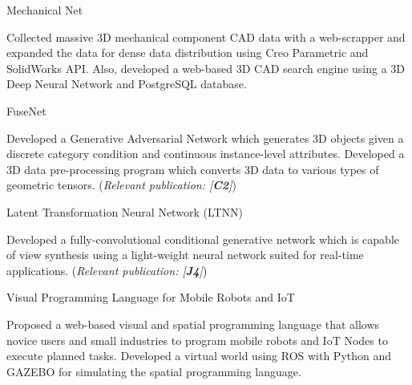 


\begin{cventries}

\cvpub
{Mechanical Net} %
{ %
\begin{cvitems}
\item {Collected massive 3D mechanical component CAD data with a web-scrapper and expanded the data for dense data distribution using Creo Parametric and SolidWorks API. Also, developed a web-based 3D CAD search engine using a 3D Deep Neural Network and PostgreSQL database.}
\end{cvitems}
}

\cvpub
{FuseNet} %
{ %
\begin{cvitems}
\item {Developed a Generative Adversarial Network which generates 3D objects given a discrete category condition and continuous instance-level attributes. Developed a 3D data pre-processing program which converts 3D data to various types of geometric tensors. (\textit{Relevant publication: [\textbf{C2}]})}
\end{cvitems}
}


\cvpub
{Latent Transformation Neural Network (LTNN)} %
{ %
\begin{cvitems}
\item {Developed a fully-convolutional conditional generative network which is capable of view synthesis using a light-weight neural network suited for real-time applications. (\textit{Relevant publication: [\textbf{J4}]})}
\end{cvitems}
}


\cvpub
{Visual Programming Language for Mobile Robots and IoT} %
{ %
\begin{cvitems}
\item {Proposed a web-based visual and spatial programming language that allows novice users and small industries to program mobile robots and IoT Nodes to execute planned tasks. Developed a virtual world using ROS with Python and GAZEBO for simulating the spatial programming language.}
\end{cvitems} 
}


\end{cventries}
